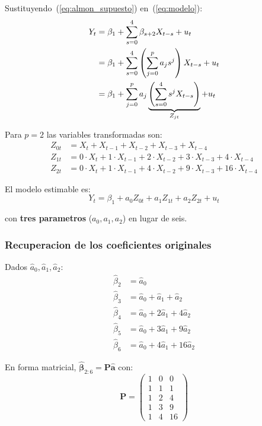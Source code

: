 \documentclass[12pt, letterpaper]{article}
\theoremstyle{remark}
\begin{document}
Sustituyendo~(\ref{eq:almon_supuesto}) en~(\ref{eq:modelo}):
\begin{align}
  Y_t
  &= \beta_1 + \sum_{s=0}^{4}\beta_{s+2} X_{t-s} + u_t \notag\\
  &= \beta_1 + \sum_{s=0}^{4}\left(\sum_{j=0}^{p} a_j s^j\right) X_{t-s} + u_t \notag\\
  &= \beta_1 + \sum_{j=0}^{p} a_j \underbrace{\left(\sum_{s=0}^{4} s^j X_{t-s}\right)}_{Z_{jt}} + u_t
  \label{eq:almon_derivacion}
\end{align}

Para $p = 2$ las variables transformadas son:
\begin{align}
  Z_{0t} &= X_t + X_{t-1} + X_{t-2} + X_{t-3} + X_{t-4}
  \label{eq:Z0}\\
  Z_{1t} &= 0\cdot X_t + 1\cdot X_{t-1} + 2\cdot X_{t-2} + 3\cdot X_{t-3} + 4\cdot X_{t-4}
  \label{eq:Z1}\\
  Z_{2t} &= 0\cdot X_t + 1\cdot X_{t-1} + 4\cdot X_{t-2} + 9\cdot X_{t-3} + 16\cdot X_{t-4}
  \label{eq:Z2}
\end{align}

El modelo estimable es:
\begin{equation}
  \boxed{Y_t = \beta_1 + a_0 Z_{0t} + a_1 Z_{1t} + a_2 Z_{2t} + u_t}
  \label{eq:almon_final}
\end{equation}

\noindent con \textbf{tres parametros} ($a_0, a_1, a_2$) en lugar de seis.

\subsubsection{Recuperacion de los coeficientes originales}

Dados $\hat a_0, \hat a_1, \hat a_2$:
\begin{align}
  \hat\beta_2 &= \hat a_0 \label{eq:rec0}\\
  \hat\beta_3 &= \hat a_0 + \hat a_1 + \hat a_2 \label{eq:rec1}\\
  \hat\beta_4 &= \hat a_0 + 2\hat a_1 + 4\hat a_2 \label{eq:rec2}\\
  \hat\beta_5 &= \hat a_0 + 3\hat a_1 + 9\hat a_2 \label{eq:rec3}\\
  \hat\beta_6 &= \hat a_0 + 4\hat a_1 + 16\hat a_2 \label{eq:rec4}
\end{align}

En forma matricial, $\hat{\boldsymbol{\beta}}_{2:6} = \mathbf{P}\hat{\mathbf{a}}$ con:
\begin{equation}
  \mathbf{P} =
  \begin{pmatrix}
    1 & 0 & 0 \\ 1 & 1 & 1 \\ 1 & 2 & 4 \\ 1 & 3 & 9 \\ 1 & 4 & 16
  \end{pmatrix}
  \label{eq:almon_P}
\end{equation}
\end{document}

